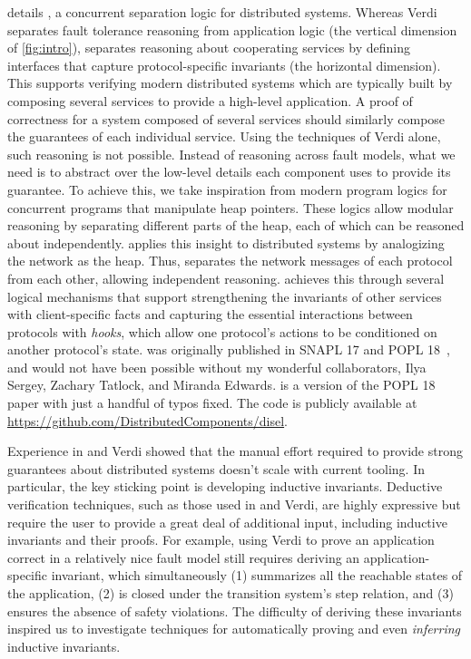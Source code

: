 
 details \disel,
  a concurrent separation logic for distributed systems.
Whereas
  Verdi separates fault tolerance reasoning from application logic
  (the vertical dimension of \cref{fig:intro}),
  \disel separates reasoning about cooperating services
  by defining interfaces that capture protocol-specific invariants
  (the horizontal dimension).
This supports verifying modern distributed systems
  which are typically built by composing several services
  to provide a high-level application.
A proof of correctness for a system composed of several services
  should similarly compose the guarantees of each individual service.
Using the techniques of Verdi alone,
  such reasoning is not possible.
Instead of reasoning across fault models,
  what we need is
  to abstract over the low-level details
  each component uses to provide its guarantee.
To achieve this, we take inspiration
  from modern program logics for concurrent programs
  that manipulate heap pointers.
These logics allow modular reasoning
  by separating different parts of the heap,
  each of which can be reasoned about independently.
\disel applies this insight to distributed systems
  by analogizing the network as the heap.
Thus, \disel separates the network messages
  of each protocol from each other,
  allowing independent reasoning.
\disel achieves this through several logical mechanisms
  that support strengthening the invariants
  of other services with client-specific facts and
  capturing the essential interactions
  between protocols with \emph{hooks},
  which allow one protocol's actions
  to be conditioned on another protocol's state.
\disel was originally published in SNAPL 17 and POPL 18~\cite{Wilcox-al:SNAPL17, disel-popl18},
  and would not have been possible without my wonderful collaborators,
  Ilya Sergey, Zachary Tatlock, and Miranda Edwards.
 is a version of the POPL 18 paper with just a handful of typos fixed.
The \disel code is publicly available at \url{https://github.com/DistributedComponents/disel}.

Experience in \disel and Verdi showed
  that the manual effort required
  to provide strong guarantees about distributed systems
  doesn't scale with current tooling.
In particular, the key sticking point is developing inductive invariants.
Deductive verification techniques,
  such as those used in \disel and Verdi,
  are highly expressive
  but require the user to provide a great deal of additional input,
  including inductive invariants and their proofs.
For example, using Verdi to prove an application correct
  in a relatively nice fault model
  still requires deriving an application-specific invariant,
  which simultaneously
    (1) summarizes all the reachable states of the application,
    (2) is closed under the transition system's step relation, and
    (3) ensures the absence of safety violations.
The difficulty of deriving these invariants
  inspired us to investigate techniques
  for automatically proving and even \emph{inferring} inductive invariants.

